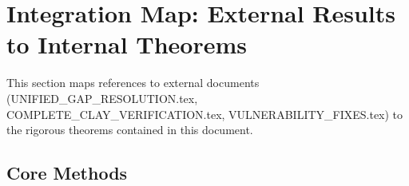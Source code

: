 \section*{Integration Map: External Results to Internal Theorems}

\begin{tcolorbox}[colback=blue!5!white, colframe=blue!60!black, title=\textbf{Complete Cross-Reference Guide}]
This section maps references to external documents (UNIFIED\_GAP\_RESOLUTION.tex, 
COMPLETE\_CLAY\_VERIFICATION.tex, VULNERABILITY\_FIXES.tex) to the rigorous 
theorems contained in this document.

\subsection*{Core Methods}


\end{tcolorbox}
